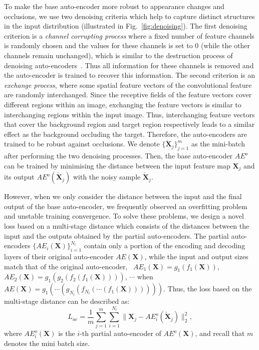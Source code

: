 \documentclass[10pt,twocolumn,letterpaper]{article}
\begin{document}
To make the base auto-encoder more robust to appearance changes and occlusions, we use two denoising criteria which help to capture distinct structures in the input distribution (illustrated in Fig.~\ref{fig:denoising}). 
The first denoising criterion is a {\it channel corrupting process} where a fixed number of feature channels is randomly chosen and the values for these channels is set to $0$ (while the other channels remain unchanged), which is similar to the destruction process of denoising auto-encoders~\cite{ref:dAE}.
Thus all information for these channels is removed and the auto-encoder is trained to recover this information. 
The second criterion is an {\it exchange process}, where some spatial feature vectors of the convolutional feature are randomly interchanged.
Since the receptive fields of the feature vectors cover different regions within an image, exchanging the feature vectors is similar to interchanging regions within the input image. Thus, interchanging feature vectors that cover the background region and target region respectively leads to a similar effect as the background occluding the target. Therefore, the auto-encoders are trained to be robust against occlusions.
We denote $\{ \check{\mathbf{X}}_j \}_{j=1}^m$ as the mini-batch after performing the two denoising processes.
Then, the base auto-encoder $AE^o$ can be trained by minimising the distance between the input feature map $\mathbf{X}_j$ and its output $AE^o(\check{\mathbf{X}}_j)$ with the noisy sample $\check{\mathbf{X}}_j$. 


However, when we only consider the distance between the input and the final output of the base auto-encoder, we frequently observed an overfitting problem and unstable training convergence. To solve these problems, we design a novel loss based on a multi-stage distance which consists of the distances between the input and the outputs obtained by the partial auto-encoders. The partial auto-encoders $\{AE_i(\mathbf{X})\}_{i=1}^{N_l}$ contain only a portion of the encoding and decoding layers of their original auto-encoder $AE(\mathbf{X})$, while the input and output sizes match that of the original auto-encoder, \ie\ $AE_1(\mathbf{X})=g_1(f_1(\mathbf{X}))$, $AE_2(\mathbf{X})=g_1(g_2(f_2(f_1(\mathbf{X}))))$, $\cdots$ when $AE(\mathbf{X}) = g_1(\cdots (g_{N_l}(f_{N_l}(\cdots(f_1(\mathbf{X}))))))$. Thus, the loss based on the multi-stage distance can be described as:
\small
\begin{equation}
L_{ae} = \frac{1}{m} \sum_{j=1}^m \sum_{i=1}^{N_l} \| \mathbf{X}_j - AE^o_i(\check{\mathbf{X}}_j) \|_2^2,
\end{equation}
\normalsize
where $AE^o_i(\mathbf{X})$ is the $i$-th partial auto-encoder of $AE^o(\mathbf{X})$, and recall that $m$ denotes the mini batch size.
\end{document}
